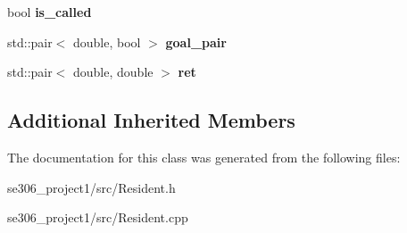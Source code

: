 \begin{DoxyCompactItemize}
\item 
\hypertarget{classResident_aa2c1d458eb7b852af9aaa39132e0d85a}{bool {\bfseries is\-\_\-called}}\label{classResident_aa2c1d458eb7b852af9aaa39132e0d85a}

\item 
\hypertarget{classResident_af86d17339240199486745bdd27da0ca5}{std\-::pair$<$ double, bool $>$ {\bfseries goal\-\_\-pair}}\label{classResident_af86d17339240199486745bdd27da0ca5}

\item 
\hypertarget{classResident_a790131eeebec8aed96b90bd1d9ce7fef}{std\-::pair$<$ double, double $>$ {\bfseries ret}}\label{classResident_a790131eeebec8aed96b90bd1d9ce7fef}

\end{DoxyCompactItemize}
\subsection*{Additional Inherited Members}


The documentation for this class was generated from the following files\-:\begin{DoxyCompactItemize}
\item 
se306\-\_\-project1/src/Resident.\-h\item 
se306\-\_\-project1/src/Resident.\-cpp\end{DoxyCompactItemize}

